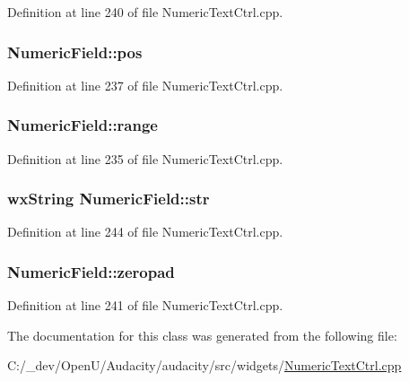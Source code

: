 Definition at line 240 of file Numeric\+Text\+Ctrl.\+cpp.

\subsubsection[{\texorpdfstring{pos}{pos}}]{ Numeric\+Field\+::pos}\hypertarget{class_numeric_field_adc3df0949424eb5225992d46f7d7a0e0}{}\label{class_numeric_field_adc3df0949424eb5225992d46f7d7a0e0}


Definition at line 237 of file Numeric\+Text\+Ctrl.\+cpp.

\subsubsection[{\texorpdfstring{range}{range}}]{ Numeric\+Field\+::range}\hypertarget{class_numeric_field_abf84e475674cb74bf9c854cb09239e4a}{}\label{class_numeric_field_abf84e475674cb74bf9c854cb09239e4a}


Definition at line 235 of file Numeric\+Text\+Ctrl.\+cpp.

\subsubsection[{\texorpdfstring{str}{str}}]{\setlength{\rightskip}{0pt plus 5cm}wx\+String Numeric\+Field\+::str}\hypertarget{class_numeric_field_a47312fed26f52a67407bf71e117d7af0}{}\label{class_numeric_field_a47312fed26f52a67407bf71e117d7af0}


Definition at line 244 of file Numeric\+Text\+Ctrl.\+cpp.

\subsubsection[{\texorpdfstring{zeropad}{zeropad}}]{ Numeric\+Field\+::zeropad}\hypertarget{class_numeric_field_a3fdd5d26f5edd03c39ada91bc8137c73}{}\label{class_numeric_field_a3fdd5d26f5edd03c39ada91bc8137c73}


Definition at line 241 of file Numeric\+Text\+Ctrl.\+cpp.



The documentation for this class was generated from the following file\+:\begin{DoxyCompactItemize}
\item 
C\+:/\+\_\+dev/\+Open\+U/\+Audacity/audacity/src/widgets/\hyperlink{_numeric_text_ctrl_8cpp}{Numeric\+Text\+Ctrl.\+cpp}\end{DoxyCompactItemize}
